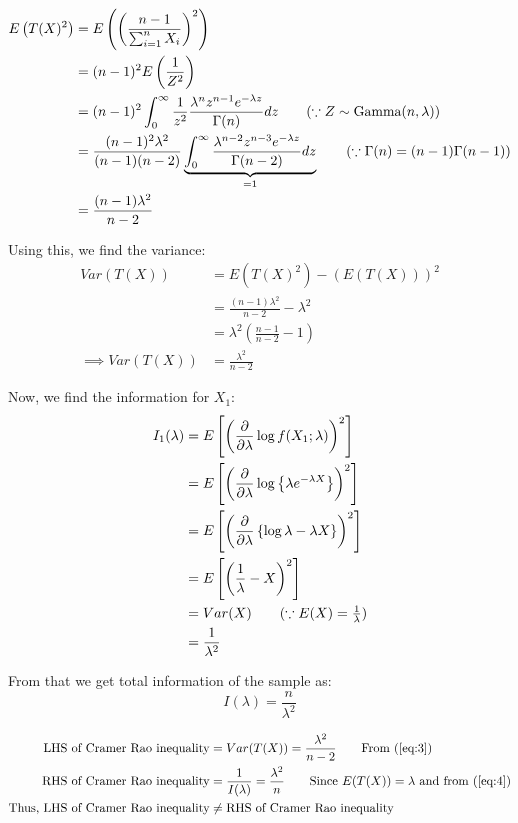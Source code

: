 \documentclass[12pt, oneside]{article}
\begin{document}
\begin{enumerate}
{  \begin{align*}
    E\left(T(X)^2\right) &= E\left(\left(\frac{n-1}{\sum_{i=1}^{n} X_i}\right)^2\right) \\
      &= (n - 1)^2 E\left(\frac{1}{Z^2}\right) \\
      &= (n - 1)^2 \int_{0}^{\infty} \frac{1}{z^2} \frac{\lambda^n z^{n-1} e^{-\lambda z}}{\Gamma(n)} dz \tag*{(\(\because Z \sim \text{Gamma}(n, \lambda)\))} \\
      &= \frac{(n - 1)^2 \lambda^2}{(n - 1)(n - 2)}\underbrace{\int_{0}^{\infty}\frac{\lambda^{n-2} z^{n-3} e^{-\lambda z}}{\Gamma(n-2)} dz}_{=1} \tag*{(\(\because \Gamma(n) = (n-1) \Gamma(n-1)\))} \\
      &= \frac{(n - 1) \lambda^2}{n - 2}
  \end{align*}

  Using this, we find the variance:
  \begin{align}
    Var(T(X)) &= E(T(X)^2) - (E(T(X)))^2 \nonumber\\
      &= \frac{(n - 1) \lambda^2}{n - 2} - \lambda^2 \nonumber\\
      &= \lambda^2 \left(\frac{n-1}{n-2} - 1\right) \nonumber\\
    \implies Var(T(X)) &= \frac{\lambda^2}{n - 2} \label{eq:3}
  \end{align}

  Now, we find the information for \(X_1\):
  \begin{align*}
    I_1(\lambda) &= E\left[\left(\frac{\partial}{\partial\lambda} \log f(X_1; \lambda)\right)^2\right] \\
      &= E\left[\left(\frac{\partial}{\partial\lambda} \log\left\{\lambda e^{-\lambda X}\right\}\right)^2\right] \\
      &= E\left[\left(\frac{\partial}{\partial\lambda} \left\{\log{\lambda} - \lambda X\right\} \right)^2\right] \\
      &= E\left[\left(\frac{1}{\lambda} - X\right)^2\right] \\
      &= Var(X) \tag*{(\(\because E(X) = \frac{1}{\lambda}\))}\\
      &= \frac{1}{\lambda^2}
  \end{align*}

  From that we get total information of the sample as:
  \begin{equation}
    I(\lambda) = \frac{n}{\lambda^2} \label{eq:4}
  \end{equation}

  \begin{align*}
    \text{LHS of Cramer Rao inequality} &= Var(T(X)) = \frac{\lambda^2}{n - 2} \tag*{From (\ref{eq:3})} \\
    \text{RHS of Cramer Rao inequality} &= \frac{1}{I(\lambda)} = \frac{\lambda^2}{n} \tag*{Since \(E(T(X)) = \lambda\) and from (\ref{eq:4})} \\
    \text{Thus, LHS of Cramer Rao inequality} &\neq \text{RHS of Cramer Rao inequality}
  \end{align*}

}
\end{enumerate}
\end{document}
